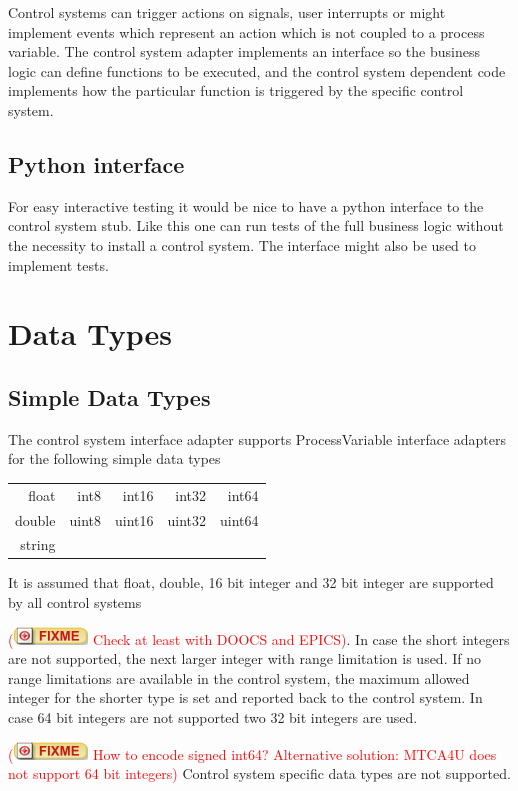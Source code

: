 \documentclass[11pt,a4paper]{scrartcl}
\newcounter{nFixmes}
\newcommand{\fixme}[1]{\addtocounter{nFixmes}{1}\textcolor{red}{(\includegraphics[height=2ex]{fixme} #1)}\xspace}
\begin{document}
Control systems can trigger actions on signals, user interrupts or might
implement events which represent an action which is not coupled to a process
variable. The control system adapter implements an interface so the business
logic can define functions to be executed, and the control system dependent
code implements how the particular function is triggered by the specific
control system. 

\subsection{Python interface}

For easy interactive testing it would be nice to have a python interface to
the control system stub. Like this one can run tests of the full business
logic without the necessity to install a control system. The interface might
also be used to implement tests. 

\section{Data Types}

\subsection{Simple Data Types}

The control system interface adapter supports ProcessVariable interface
adapters for the following simple data types\\[2ex] 
\begin{tabular}{rrrrr}
float & int8 & int16 & int32 & int64\\
double & uint8 & uint16 & uint32 & uint64 \\
string\\[2ex]
\end{tabular}

It is assumed that float, double, 16 bit integer and 32 bit integer are
supported by all control systems \fixme{Check at least with DOOCS and
  EPICS}. In case the short integers are not supported, the next larger
integer with range limitation is used. If no range limitations are available
in the control system, the maximum allowed integer for the shorter type is set
and reported back to the control system. In case 64 bit integers are not
supported two 32 bit integers are used. \fixme{How to encode signed int64?
  Alternative solution: MTCA4U does not support 64 bit integers} 
Control system specific data types are not supported.
\end{document}
